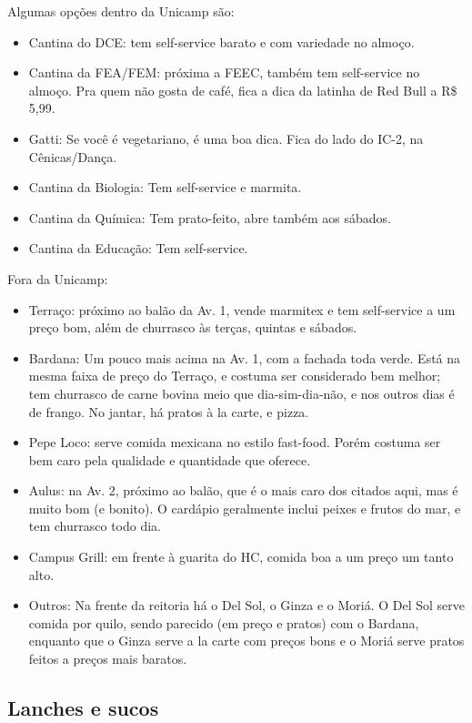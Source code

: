 Algumas opções dentro da Unicamp são:

\begin{itemize}
\item Cantina do DCE: tem self-service barato e com variedade no almoço.
\item Cantina da FEA/FEM: próxima a FEEC, também tem self-service no almoço. Pra
  quem não gosta de café, fica a dica da latinha de Red Bull a R\$ 5,99.
\item Gatti: Se você é vegetariano, é uma boa dica. Fica do lado do IC-2, na
  Cênicas/Dança.
\item Cantina da Biologia: Tem self-service e marmita.
\item Cantina da Química:  Tem prato-feito, abre também aos sábados.
\item Cantina da Educação: Tem self-service.
\end {itemize}

Fora da Unicamp:

\begin{itemize}
\item Terraço: próximo ao balão da Av. 1, vende marmitex e tem self-service a um
  preço bom, além de churrasco às terças, quintas e sábados.
\item Bardana: Um pouco mais acima na Av. 1, com a fachada toda verde. Está na
  mesma faixa de preço do Terraço, e costuma ser considerado bem melhor; tem
  churrasco de carne bovina meio que dia-sim-dia-não, e nos outros dias é de
  frango. No jantar, há pratos à la carte, e pizza.
\item Pepe Loco: serve comida mexicana no estilo fast-food. Porém costuma ser
  bem caro pela qualidade e quantidade que oferece.
\item Aulus: na Av. 2, próximo ao balão, que é o mais caro dos citados aqui, mas
  é muito bom (e bonito). O cardápio geralmente inclui peixes e frutos do mar, e
  tem churrasco todo dia.
\item Campus Grill: em frente à guarita do HC, comida boa a um preço um tanto
  alto.
\item Outros: Na frente da reitoria há o Del Sol, o Ginza e o Moriá.  O Del Sol
  serve comida por quilo, sendo parecido (em preço e pratos) com o Bardana,
  enquanto que o Ginza serve a la carte com preços bons e o Moriá serve pratos
  feitos a preços mais baratos. 
\end{itemize}

\subsection{Lanches e sucos}

